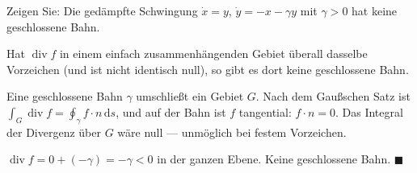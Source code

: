 \begin{aufgabe}
Zeigen Sie: Die gedämpfte Schwingung $\dot x = y$, $\dot y = -x - \gamma y$ mit $\gamma > 0$ hat keine geschlossene Bahn.

\loesung
{}
Hat $\operatorname{div} f$ in einem einfach zusammenhängenden Gebiet überall dasselbe Vorzeichen (und ist nicht identisch null), so gibt es dort keine geschlossene Bahn.

Eine geschlossene Bahn $\gamma$ umschließt ein Gebiet $G$. Nach dem Gaußschen Satz ist $\int_G\operatorname{div} f = \oint_\gamma f\cdot n\,\mathrm ds$, und auf der Bahn ist $f$ tangential: $f\cdot n = 0$. Das Integral der Divergenz über $G$ wäre null --- unmöglich bei festem Vorzeichen.

$\operatorname{div} f = 0 + (-\gamma) = -\gamma < 0$ in der ganzen Ebene. Keine geschlossene Bahn. $\blacksquare$

\begin{center}
\begin{minipage}{0.88\textwidth}
\end{minipage}
\end{center}
\end{aufgabe}

